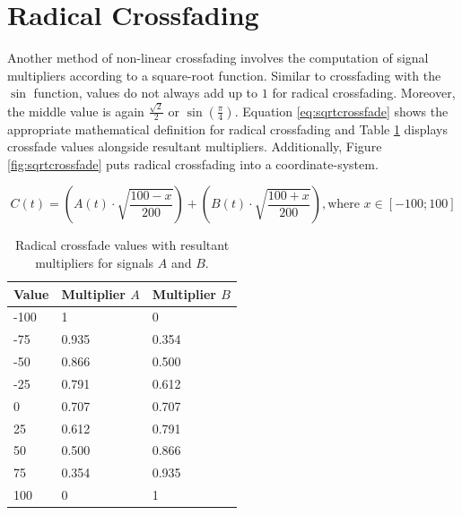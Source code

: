 \pagebreak

\section{Radical Crossfading}

Another method of non-linear crossfading involves the computation of signal multipliers according to a square-root function. Similar to crossfading with the $\sin$ function, values do not always add up to $1$ for radical crossfading. Moreover, the middle value is again $\frac{\sqrt{2}}{2}$ or $\sin(\frac{\pi}{4})$. Equation \ref{eq:sqrtcrossfade} shows the appropriate mathematical definition for radical crossfading and Table \ref{tb:sqrtcrossfade} displays crossfade values alongside resultant multipliers. Additionally, Figure \ref{fig:sqrtcrossfade} puts radical crossfading into a coordinate-system.

\begin{equation}
  C(t) = (A(t) \cdot \sqrt{\frac{100 - x}{200}}) + (B(t) \cdot \sqrt{\frac{100 + x}{200}}), \text{where } x \in [-100;100]
  \label{eq:sqrtcrossfade}
\end{equation}

\begin{table}[ht!]

  \centering

  \begin{tabular}[]{| l | l | l |}
    \hline
    \rowcolor[gray]{0.8}
    Value & Multiplier $A$ & Multiplier $B$ \\\hline
    -100 & 1 & 0\\\hline
    -75 & 0.935 & 0.354\\\hline
    -50 & 0.866 & 0.500\\\hline
    -25 & 0.791 & 0.612\\\hline
    0 & 0.707 & 0.707\\\hline
    25 & 0.612 & 0.791\\\hline
    50 & 0.500 & 0.866\\\hline
    75 & 0.354 & 0.935\\\hline
    100 & 0 & 1\\
    \hline
  \end{tabular}

  \caption{Radical crossfade values with resultant multipliers for signals $A$ and $B$.}

  \label{tb:sqrtcrossfade}

\end{table}

